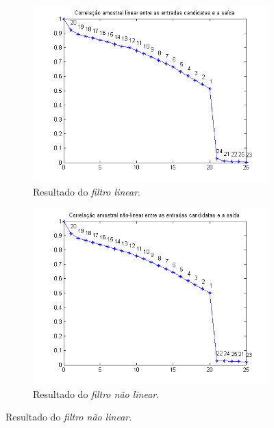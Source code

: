 \begin{enumerate}
\begin{enumerate}
				\begin{figure}
				
				\centering
				
					\begin{subfigure}{.5\textwidth}
					  \centering
					  \includegraphics[width=1\linewidth]{image/filtro_lin}
					  \caption{Resultado do \textit{filtro linear}.}
					  \label{fig:filtro_lin}
					\end{subfigure}%
					\begin{subfigure}{.5\textwidth}
					  \centering
					  \includegraphics[width=1\linewidth]{image/filtro_nlin}
					  \caption{Resultado do \textit{filtro não linear}.}
					  \label{fig:filtro_nlin}
				\end{subfigure}
				

\end{figure}
\end{enumerate}
\end{enumerate}

